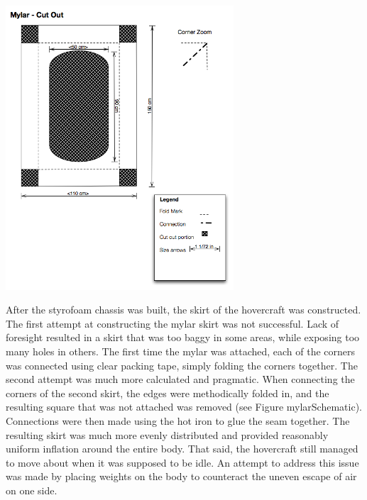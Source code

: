 \begin{minipage}{6.5in}
\begin{minipage}{6.5in}
\begin{minipage}{6.5in}
  \begin{center}
    \includegraphics[width=85mm]{imageSources/mylarSchematic.png}
  \end{center}
  \label{mylarSchematic}
\end{minipage}

After the styrofoam chassis was built, the skirt of the hovercraft was constructed. The first attempt at constructing the mylar skirt was not successful. Lack of foresight resulted in a skirt that was too baggy in some areas, while exposing too many holes in others. The first time the mylar was attached, each of the corners was connected using clear packing tape, simply folding the corners together. The second attempt was much more calculated and pragmatic. When connecting the corners of the second skirt, the edges were methodically folded in, and the resulting square that was not attached was removed (see Figure mylarSchematic). Connections were then made using the hot iron to glue the seam together. The resulting skirt was much more evenly distributed and provided reasonably uniform inflation around the entire body. That said, the hovercraft still managed to move about when it was supposed to be idle. An attempt to address this issue was made by placing weights on the body to counteract the uneven escape of air on one side.


\end{minipage}
\end{minipage}
